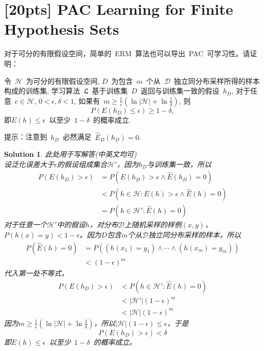 \documentclass[a4paper,UTF8]{article}
\newtheorem*{solution}{Solution}
\numberwithin{equation}{section}
\begin{document}
\newpage
\section{[20pts] PAC Learning for Finite Hypothesis Sets}
对于可分的有限假设空间，简单的~ERM~算法也可以导出~PAC~可学习性。请证明：

令~$\mathcal{H}$~为可分的有限假设空间, $D$~为包含~$m$~个从~$\mathcal{D}$~独立同分布采样所得的样本构成的训练集, 学习算法~$\mathfrak{L}$~基于训练集~$D$~返回与训练集一致的假设~$h_D$, 对于任意~$c\in \mathcal{H}$, $0<\epsilon, \delta < 1$, 如果有~$m \geq \frac{1}{\epsilon}(\ln|\mathcal{H}|+\ln\frac{1}{\delta})$, 则
\begin{equation}
    P\left(E(h_D)\leq\epsilon\right)\geq 1-\delta,
\end{equation}
即$E(h)\leq\epsilon$~以至少~$1-\delta$~的概率成立.

\noindent 提示：注意到~$h_D$~必然满足~$\widehat{E}_D(h_D) = 0$.

\begin{solution}
此处用于写解答(中英文均可)\\
设泛化误差大于$\epsilon$的假设组成集合$\mathcal{H'}$，因为$h_D$与训练集一致，所以
\begin{align*}
	P(E(h_D)>\epsilon)&=P(E(h_D)>\epsilon\land \hat{E}(h_D)=0)\\
					&<P(h\in \mathcal{H}: E(h)>\epsilon\land \hat{E}(h)=0)\\
					&=P(h\in \mathcal{H'}: \hat{E}(h)=0)
\end{align*}
对于任意一个$\mathcal{H'}$中的假设$h$，对分布$\mathcal{D}$上随机采样的样例$(x,y)$，$P(h(x)=y)<1-\epsilon$。因为$D$包含$m$个从$\mathcal{D}$独立同分布采样的样本，所以
\begin{align*}
	P(\hat{E}(h)=0)&=P((h(x_1)=y_1)\land\cdots\land(h(x_m)=y_m))\\
				&<(1-\epsilon)^m
\end{align*}
代入第一处不等式，
\begin{align*}
	P(E(h_D)>\epsilon)&<P(h\in \mathcal{H'}: \hat{E}(h)=0)\\
					&<\vert\mathcal{H'}\vert (1-\epsilon)^m\\
					&<\vert\mathcal{H}\vert (1-\epsilon)^m
\end{align*}
因为$m \geq \frac{1}{\epsilon}(\ln|\mathcal{H}|+\ln\frac{1}{\delta})$，所以$\vert\mathcal{H}\vert (1-\epsilon)\leq\epsilon$，于是
\[P(E(h_D)>\epsilon)<\delta\]
即$E(h)\leq\epsilon$~以至少~$1-\delta$~的概率成立。
\end{solution}
\end{document}
